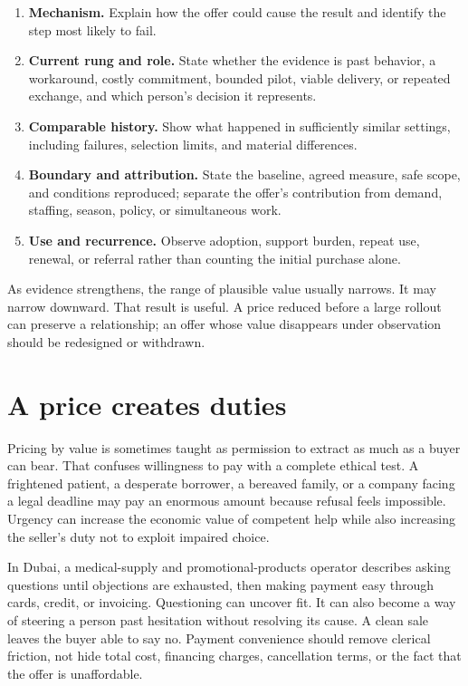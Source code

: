 \begin{enumerate}[itemsep=0.15em]
\item \textbf{Mechanism.} Explain how the offer could cause the result and
  identify the step most likely to fail.
\item \textbf{Current rung and role.} State whether the evidence is past
  behavior, a workaround, costly commitment, bounded pilot, viable delivery,
  or repeated exchange, and which person's decision it represents.
\item \textbf{Comparable history.} Show what happened in sufficiently similar
  settings, including failures, selection limits, and material differences.
\item \textbf{Boundary and attribution.} State the baseline, agreed measure,
  safe scope, and conditions reproduced; separate the offer's contribution
  from demand, staffing, season, policy, or simultaneous work.
\item \textbf{Use and recurrence.} Observe adoption, support burden, repeat
  use, renewal, or referral rather than counting the initial purchase alone.
\end{enumerate}

As evidence strengthens, the range of plausible value usually narrows. It may
narrow downward. That result is useful. A price reduced before a large rollout
can preserve a relationship; an offer whose value disappears under observation
should be redesigned or withdrawn.

\section{A price creates duties}

Pricing by value is sometimes taught as permission to extract as much as a
buyer can bear. That confuses willingness to pay with a complete ethical test.
A frightened patient, a desperate borrower, a bereaved family, or a company
facing a legal deadline may pay an enormous amount because refusal feels
impossible. Urgency can increase the economic value of competent help while
also increasing the seller's duty not to exploit impaired choice.

In Dubai, a medical-supply and promotional-products operator describes asking
questions until objections are exhausted, then making payment easy through
cards, credit, or invoicing. Questioning can uncover fit. It can also become a
way of steering a person past hesitation without resolving its cause. A clean
sale leaves the buyer able to say no. Payment convenience should remove
clerical friction, not hide total cost, financing charges, cancellation terms,
or the fact that the offer is unaffordable.

